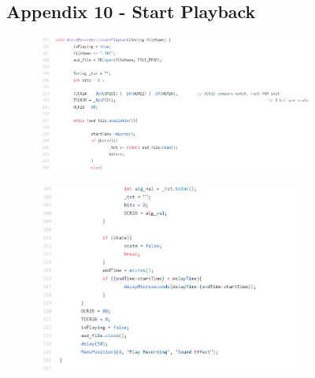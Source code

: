 \documentclass[11pt]{article}
\begin{document}
\begin{figure}
\subsection{Appendix 10 - Start Playback}
    \begin{subfigure}{\textwidth}
    \centering
    \includegraphics[width=1.2\textwidth]{Images/play_5.png}
    \end{subfigure}    
    
    \begin{subfigure}{\textwidth}
    \centering
    \includegraphics[width=0.95\textwidth]{Images/Play_6.png}
    \end{subfigure}    
\end{figure}
\end{document}
